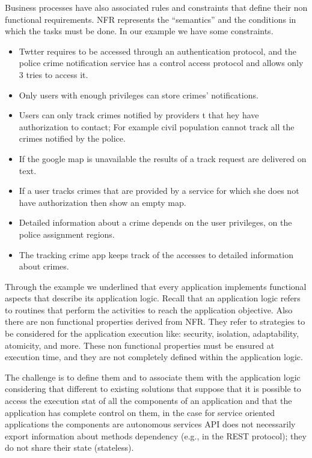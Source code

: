 Business processes have also associated rules and constraints that define their non functional requirements.  
NFR represents the “semantics” and the conditions in which the tasks must be done. 
In our example we have some constraints. 
\begin{itemize}
\item Twtter requires to be accessed through an authentication protocol, and the police crime notification service has a control  access protocol and allows only 3 tries to access it. 
\item Only users with enough privileges can store crimes’ notifications. 
\item Users can only track crimes notified by providers t that hey have authorization to contact; For example civil population cannot track all the crimes notified by the police. 
\item If the google map is unavailable the results of a track request are delivered on text. 
\item If a user tracks crimes that are provided by a service for which she does not have authorization then show an empty map. 
\item Detailed information about a crime depends on the user privileges, on the police assignment regions. 
\item The tracking crime app keeps track of the accesses to detailed information about crimes. 
\end{itemize}

Through the example we underlined that every application implements functional aspects that describe its application logic. Recall that an application logic refers to routines that perform the activities to reach the application objective.
Also there are non functional properties derived from NFR. They refer to strategies to be considered for the application execution like: security, isolation, adaptability, atomicity, and more.
These non functional properties must be ensured at execution time, and they are not completely defined within the application logic.

The challenge is to define them and to associate them with the application logic considering that different to existing solutions that suppose that it is possible to access the execution stat of all the components  of an application and that the application has complete control on them, in the case for service oriented applications  the components are autonomous services
API does not necessarily export information about methods dependency (e.g., in the REST protocol);
they do not share their state (stateless).







